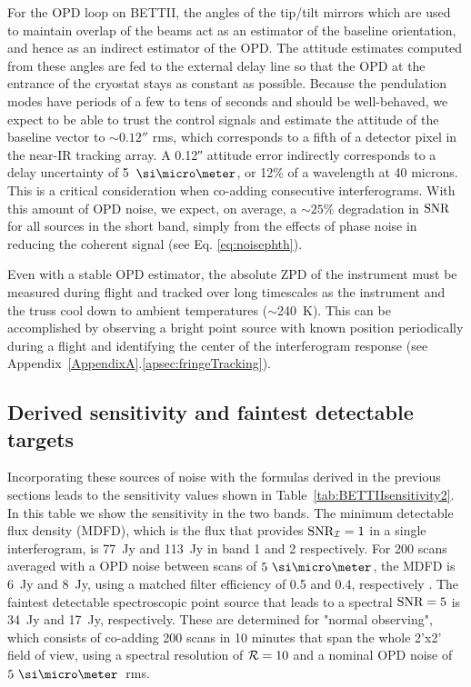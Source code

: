 For the OPD loop on BETTII, the angles of the tip/tilt mirrors which are used to maintain overlap of the beams act as an estimator of the baseline orientation, and hence as an indirect estimator of the OPD. The attitude estimates computed from these angles are fed to the external delay line so that the OPD at the entrance of the cryostat stays as constant as possible. Because the pendulation modes have periods of a few to tens
of seconds and should be well-behaved, we expect to be able to trust the control signals and estimate the attitude of the baseline vector to $\sim \ang{;;0.12}$ rms, which corresponds to a fifth of a detector pixel in the near-IR tracking array. A \ang{;;0.12} attitude error indirectly corresponds to a delay uncertainty of 5~$\um$, or 12\% of a wavelength at 40 microns. This is a critical consideration when co-adding consecutive interferograms. With this amount of OPD noise, we expect, on average, a $\sim 25\%$ degradation in $\textrm{SNR}$ for all sources in the short band, simply from the effects of phase noise in reducing the coherent signal (see Eq. \ref{eq:noisephth}).

Even with a stable OPD estimator, the absolute ZPD of the instrument must be measured during flight and tracked over long timescales as the instrument and the truss cool down to ambient temperatures ($\sim$240~K). This can be accomplished by observing a bright point source with known position periodically during a flight and identifying the center of the interferogram response (see Appendix~\ref{AppendixA}.\ref{apsec:fringeTracking}).

\subsection{Derived sensitivity and faintest detectable targets}

Incorporating these sources of noise with the formulas derived in the previous sections leads to the sensitivity values shown in Table~\ref{tab:BETTIIsensitivity2}. In this table we show the sensitivity in the two bands. The minimum detectable flux density (MDFD), which is the flux that provides $\textrm{SNR}_{\mathcal{I}} = 1$ in a single interferogram, is 77~Jy and 113~Jy in band 1 and 2 respectively. For 200 scans averaged with a OPD noise between scans of $5~\um$, the MDFD is 6~Jy and 8~Jy, using a matched filter efficiency of 0.5 and 0.4, respectively \citep{Mighell:2005fwa}. The faintest detectable spectroscopic point source that leads to a spectral $\textrm{SNR}=5$ is 34~Jy and 17~Jy, respectively. These are determined for "normal observing", which consists of co-adding 200 scans in 10 minutes that span the whole 2'x2' field of view, using a spectral resolution of $\mathcal{R}=10$ and a nominal OPD noise of $5~\um$~rms. 

